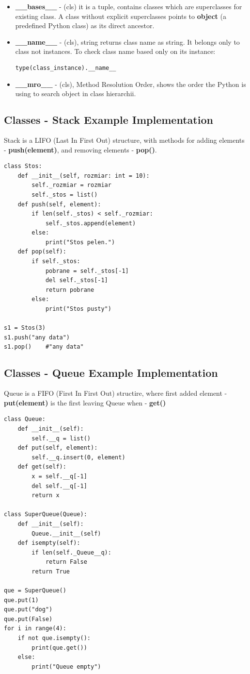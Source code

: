 \documentclass{article}
\begin{document}
\begin{itemize}
\item \textbf{\_\_bases\_\_} - (cls) it is a tuple, contains classes which are superclasses for existing class. A class without explicit superclasses points to \textbf{object} (a predefined Python class) as its direct ancestor.
\item \textbf{\_\_name\_\_} - (cls), string returns class name as string. It belongs only to class not instances. To check class name based only on its instance:
\begin{lstlisting}[style=pystyle]
type(class_instance).__name__
\end{lstlisting}
\item \textbf{\_\_mro\_\_} - (cls), Method Resolution Order, shows the order the Python is using to search object in class hierarchii.
\end{itemize}


\subsection{Classes - Stack Example Implementation}
Stack is a LIFO (Last In First Out) structure, with methods for adding elements - \textbf{push(element)}, and removing elements - \textbf{pop()}.

\begin{lstlisting}[style=pystyle]
class Stos:
    def __init__(self, rozmiar: int = 10):
        self._rozmiar = rozmiar
        self._stos = list()
    def push(self, element):
        if len(self._stos) < self._rozmiar:
            self._stos.append(element)
        else:
            print("Stos pelen.")
    def pop(self):
        if self._stos:
            pobrane = self._stos[-1]
            del self._stos[-1]
            return pobrane
        else:
            print("Stos pusty")
            
s1 = Stos(3)
s1.push("any data")
s1.pop()	#"any data"
\end{lstlisting}


\subsection{Classes - Queue Example Implementation}
Queue is a FIFO (First In First Out) structire, where first added element - \textbf{put(element)} is the first leaving Queue when - \textbf{get()}
\begin{lstlisting}[style=pystyle]
class Queue:
    def __init__(self):
        self.__q = list()
    def put(self, element):
        self.__q.insert(0, element)
    def get(self):
        x = self.__q[-1]
        del self.__q[-1]
        return x

class SuperQueue(Queue):
    def __init__(self):
        Queue.__init__(self)
    def isempty(self):
        if len(self._Queue__q):
            return False
        return True

que = SuperQueue()
que.put(1)
que.put("dog")
que.put(False)
for i in range(4):
    if not que.isempty():
        print(que.get())
    else:
        print("Queue empty")
\end{lstlisting}
\end{document}
